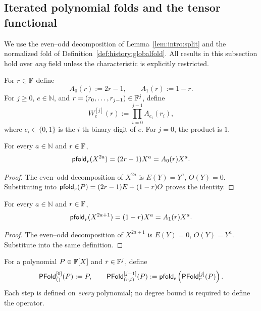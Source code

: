 \subsection{Iterated polynomial folds and the tensor functional}\label{sec:kbfoldfold:polynomial}

We use the even--odd decomposition of Lemma~\ref{lem:intro:split} and the normalized fold of Definition~\ref{def:history:globalfold}. All results in this subsection hold over \emph{any} field unless the characteristic is explicitly restricted.

\begin{definition}\label{def:kbff:bit-weights}
For $r\in\mathbb{F}$ define
\[
 A_0(r):=2r-1,\qquad A_1(r):=1-r.
\]
For $j\geq0$, $e\in\mathbb N$, and $r=(r_0,\ldots,r_{j-1})\in\mathbb{F}^j$, define
\[
 W^{[j]}_e(r):=\prod_{i=0}^{j-1} A_{e_i}(r_i),
\]
where $e_i\in\{0,1\}$ is the $i$-th binary digit of $e$.
For $j=0$, the product is $1$.
\end{definition}

\begin{lemma}\label{lem:kbff:fold-even}
For every $a\in\mathbb N$ and $r\in\mathbb{F}$,
\[
 \mathsf{pfold}_r(X^{2a})=(2r-1)X^a=A_0(r)X^a.
\]
\end{lemma}
\begin{proof}
The even--odd decomposition of $X^{2a}$ is $E(Y)=Y^a$, $O(Y)=0$. Substituting into
$\mathsf{pfold}_r(P)=(2r-1)E+(1-r)O$ proves the identity.
\end{proof}

\begin{lemma}\label{lem:kbff:fold-odd}
For every $a\in\mathbb N$ and $r\in\mathbb{F}$,
\[
 \mathsf{pfold}_r(X^{2a+1})=(1-r)X^a=A_1(r)X^a.
\]
\end{lemma}
\begin{proof}
The even--odd decomposition of $X^{2a+1}$ is $E(Y)=0$, $O(Y)=Y^a$. Substitute into the same definition.
\end{proof}

\begin{definition}\label{def:kbff:fold-iterate}
For a polynomial $P\in\mathbb{F}[X]$ and $r\in\mathbb{F}^j$, define
\[
 \mathsf{PFold}^{[0]}_{()}(P):=P,\qquad
 \mathsf{PFold}^{[j+1]}_{(r,t)}(P):=
       \mathsf{pfold}_t\left(\mathsf{PFold}^{[j]}_r(P)\right).
\]
Each step is defined on \emph{every} polynomial; no degree bound is required to define the operator.
\end{definition}

